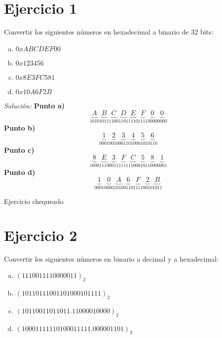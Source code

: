 \documentclass{article}
\newenvironment{solution}
    {\textit{Solución:}}
    {}
\begin{document}
\section*{Ejercicio 1}
Convertir los siguientes números en hexadecimal a binario de $32$ bits:
\begin{enumerate}[a)]
    \item $0xABCDEF00$
    \item $0x123456$
    \item $0x8E3FC581$
    \item $0x10A6F2B$
\end{enumerate}

\begin{solution}
\textbf{Punto a)}
\begin{equation*}
    \underbrace{A}_{1010}\underbrace{B}_{1011}\underbrace{C}_{1100}\underbrace{D}_{1101}\underbrace{E}_{1110}\underbrace{F}_{1111}\underbrace{0}_{0000}\underbrace{0}_{0000}
\end{equation*}
\textbf{Punto b)}
\begin{equation*}
    \underbrace{1}_{0001}\underbrace{2}_{0010}\underbrace{3}_{0011}\underbrace{4}_{0100}\underbrace{5}_{0101}\underbrace{6}_{0110}
\end{equation*}
\textbf{Punto c)}
\begin{equation*}
    \underbrace{8}_{1000}\underbrace{E}_{1110}\underbrace{3}_{0011}\underbrace{F}_{1111}\underbrace{C}_{1100}\underbrace{5}_{0101}\underbrace{8}_{1000}\underbrace{1}_{0001}
\end{equation*}
\textbf{Punto d)}
\begin{equation*}
    \underbrace{1}_{0001}\underbrace{0}_{0000}\underbrace{A}_{1010}\underbrace{6}_{0110}\underbrace{F}_{1111}\underbrace{2}_{0010}\underbrace{B}_{1011}
\end{equation*}
\end{solution}

{\color{green} Ejercicio chequeado}

\section*{Ejercicio 2}
Convertir los siguientes números en binario a decimal y a hexadecimal:
\begin{enumerate}[a)]
    \item $(1110011110000011)_2$
    \item $(10110111001101000101111)_2$
    \item $(10110011011011.11000010000)_2$
    \item $(10001111110100011111.000001101)_2$
\end{enumerate}
\end{document}
